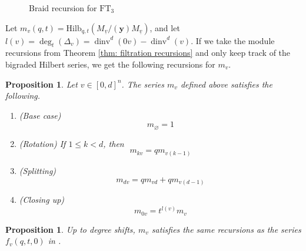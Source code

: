 \documentclass[submission]{FPSAC2027}
\DeclareMathOperator{\dinv}{dinv}
\newcommand{\uv}{\underline{v}}
\newcommand{\Hilb}{\mathrm{Hilb}}
\newcommand{\FT}{\mathrm{FT}}
\newtheorem{prop}[thm]{Proposition}
\begin{document}
\begin{figure}[H]
    \centering
{}
    \caption{Braid recursion for $\FT_3$}
    \label{fig: Braid recursion}
\end{figure}

Let $m_v(q,t) = \Hilb_{q,t}(M_{\uv}/(\mathbf{y})M_{\uv})$, and let $l(v) = \deg_t(\Delta_v) = \dinv^d(0v)-\dinv^d(v)$. If we take the module recursions from Theorem \ref{thm: filtration recursions} and only keep track of the bigraded Hilbert series, we get the following recursions for $m_v$.
\begin{prop}
\label{prop: fv recursions}
Let $v \in [0,d]^n$. The series $m_v$ defined above satisfies the following.
\begin{enumerate}
    \item (Base case) $$m_{\varnothing} = 1$$
    \item (Rotation) If $1 \leq k < d$, then
    $$m_{kv} = q m_{v(k-1)}$$
    \item (Splitting) $$m_{dv} = qm_{vd} + qm_{v(d-1)}$$
    \item (Closing up) $$m_{0v} = t^{l(v)}m_v$$
\end{enumerate}    
\end{prop}

\begin{prop}
\label{prop: Cv hilbert series}
    Up to degree shifts, $m_v$ satisfies the same recursions as the series $f_v(q,t,0)$ in \cite[Theorem 1.3]{Hog17}.
\end{prop}
\end{document}
